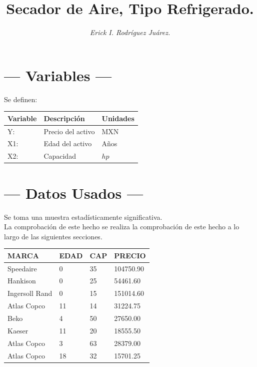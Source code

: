 \documentclass{article}
\title{\sc Secador de Aire, Tipo Refrigerado.}
\author{\it Erick I. Rodríguez Juárez.}
\begin{document}
\maketitle

\section{\centering --- Variables ---} %
Se definen:
\begin{center}
  \begin{tabular}{|l|l|l|}
    \hline 
    Variable & Descripción   & Unidades\\ \hline 
    Y:  & Precio del activo  & MXN \\ \hline 
    X1: & Edad del activo    & Años \\ \hline 
		X2: & Capacidad & \(hp\) \\ \hline 
  \end{tabular}
\end{center} 

\section{\centering --- Datos Usados ---} %
Se toma una muestra estadísticamente significativa. \\ 
La comprobación de este hecho se realiza la comprobación de este hecho a lo largo de las siguientes secciones.
\begin{center}
	\begin{tabular}{*{4}{|p{3cm}}|}
		\hline 
MARCA          & EDAD  & CAP  & PRECIO\\ \hline
Speedaire      & 0     & 35   & 104750.90\\ \hline
Hankison       & 0     & 25   & 54461.60\\ \hline
Ingersoll Rand & 0     & 15   & 151014.60\\ \hline
Atlas Copco    & 11    & 14   & 31224.75\\ \hline
Beko           & 4     & 50   & 27650.00\\ \hline
Kaeser         & 11    & 20   & 18555.50\\ \hline
Atlas Copco    & 3     & 63   & 28379.00\\ \hline
Atlas Copco    & 18    & 32   & 15701.25\\ \hline
	\end{tabular}
\end{center}
\end{document}
